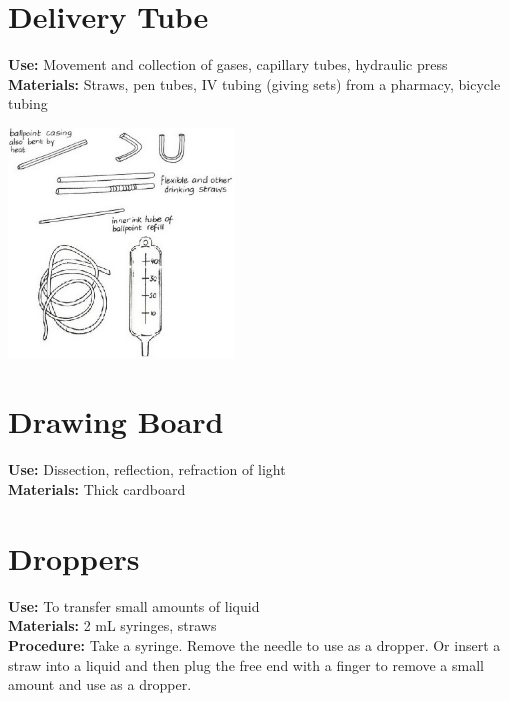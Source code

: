\begin{multicols}{2}
\section{Delivery Tube} 
\label{sec:delivery-tube}
\vspace{-10pt}
\textbf{Use:} Movement and collection of gases, capillary tubes, hydraulic press\\
\textbf{Materials:} Straws, pen tubes, IV tubing (giving sets) from a pharmacy, bicycle tubing
\begin{center}
\includegraphics[width=0.45\textwidth]{./img/vso/tubes.jpg}
\end{center}

\section{Drawing Board} 
\label{sec:drawing-board}
\vspace{-10pt}
\textbf{Use:} Dissection, reflection, refraction of light\\
\textbf{Materials:} Thick cardboard

\section{Droppers} 
\label{sec:droppers}
\vspace{-10pt}
\textbf{Use:} To transfer small amounts of liquid \\
\textbf{Materials:} 2 mL syringes, straws\\
\textbf{Procedure:} Take a syringe. Remove the needle to use as a dropper. Or insert a straw into a liquid and then plug the free end with a finger to remove a small amount and use as a dropper.

\columnbreak


\end{multicols}
